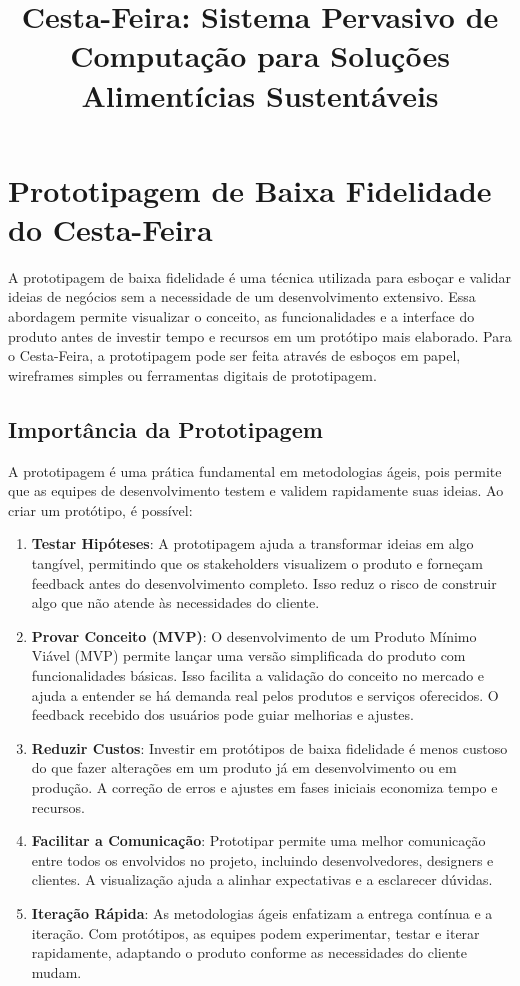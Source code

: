 \documentclass{article}
\title{Cesta-Feira: Sistema Pervasivo de Computação para Soluções Alimentícias Sustentáveis}
\author{}
\date{}
\begin{document}
\maketitle

\section{Prototipagem de Baixa Fidelidade do Cesta-Feira}
A prototipagem de baixa fidelidade é uma técnica utilizada para esboçar e validar ideias de negócios sem a necessidade de um desenvolvimento extensivo. Essa abordagem permite visualizar o conceito, as funcionalidades e a interface do produto antes de investir tempo e recursos em um protótipo mais elaborado. Para o Cesta-Feira, a prototipagem pode ser feita através de esboços em papel, wireframes simples ou ferramentas digitais de prototipagem.

\subsection{Importância da Prototipagem}
A prototipagem é uma prática fundamental em metodologias ágeis, pois permite que as equipes de desenvolvimento testem e validem rapidamente suas ideias. Ao criar um protótipo, é possível:

\begin{enumerate}
    \item \textbf{Testar Hipóteses}: A prototipagem ajuda a transformar ideias em algo tangível, permitindo que os stakeholders visualizem o produto e forneçam feedback antes do desenvolvimento completo. Isso reduz o risco de construir algo que não atende às necessidades do cliente.
    
    \item \textbf{Provar Conceito (MVP)}: O desenvolvimento de um Produto Mínimo Viável (MVP) permite lançar uma versão simplificada do produto com funcionalidades básicas. Isso facilita a validação do conceito no mercado e ajuda a entender se há demanda real pelos produtos e serviços oferecidos. O feedback recebido dos usuários pode guiar melhorias e ajustes.
    
    \item \textbf{Reduzir Custos}: Investir em protótipos de baixa fidelidade é menos custoso do que fazer alterações em um produto já em desenvolvimento ou em produção. A correção de erros e ajustes em fases iniciais economiza tempo e recursos.
    
    \item \textbf{Facilitar a Comunicação}: Prototipar permite uma melhor comunicação entre todos os envolvidos no projeto, incluindo desenvolvedores, designers e clientes. A visualização ajuda a alinhar expectativas e a esclarecer dúvidas.
    
    \item \textbf{Iteração Rápida}: As metodologias ágeis enfatizam a entrega contínua e a iteração. Com protótipos, as equipes podem experimentar, testar e iterar rapidamente, adaptando o produto conforme as necessidades do cliente mudam.
\end{enumerate}
\end{document}
